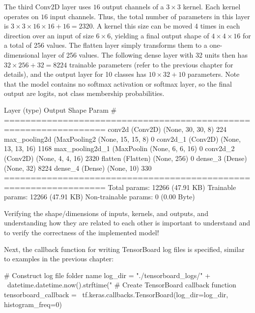 The third Conv2D layer uses $16$ output channels of a $3 \times 3$ kernel. Each kernel operates on $16$ input channels. Thus, the total number of parameters in this layer is $3 \times 3 \times 16 \times 16 + 16 = 2320$. A kernel this size can be moved 4 times in each direction over an input of size $6 \times 6$, yielding a final output shape of $4 \times 4 \times 16$ for a total of 256 values. The flatten layer simply transforms them to a one-dimensional layer of 256 values. The following dense layer with 32 units then has $32 \times 256 + 32 = 8224$ trainable parameters (refer to the previous chapter for details), and the output layer for 10 classes has $10 \times 32 + 10$ parameters. Note that the model contains no softmax activation or softmax layer, so the final output are logits, not class membership probabilities. 

\begin{samepage}
\begin{textcode}
 Layer (type)                Output Shape              Param #   
=================================================================
 conv2d (Conv2D)             (None, 30, 30, 8)         224       
 max_pooling2d (MaxPooling2  (None, 15, 15, 8)         0         
 conv2d_1 (Conv2D)           (None, 13, 13, 16)        1168      
 max_pooling2d_1 (MaxPoolin  (None, 6, 6, 16)          0         
 conv2d_2 (Conv2D)           (None, 4, 4, 16)          2320      
 flatten (Flatten)           (None, 256)               0         
 dense_3 (Dense)             (None, 32)                8224      
 dense_4 (Dense)             (None, 10)                330       
=================================================================
Total params: 12266 (47.91 KB)
Trainable params: 12266 (47.91 KB)
Non-trainable params: 0 (0.00 Byte)
\end{textcode}
\end{samepage}

\begin{tcolorbox}[colback=alert]
Verifying the shape/dimensions of inputs, kernels, and outputs, and understanding how they are related to each other is important to understand and to verify the correctness of the implemented model!
\end{tcolorbox}

Next, the callback function for writing TensorBoard log files is specified, similar to examples in the previous chapter:

\begin{samepage}
\begin{pythoncode}
# Construct log file folder name
log_dir = "./tensorboard_logs/" + \
    datetime.datetime.now().strftime("%
# Create TensorBoard callback function
tensorboard_callback = \
    tf.keras.callbacks.TensorBoard(log_dir=log_dir, histogram_freq=0)
\end{pythoncode}
\end{samepage}


